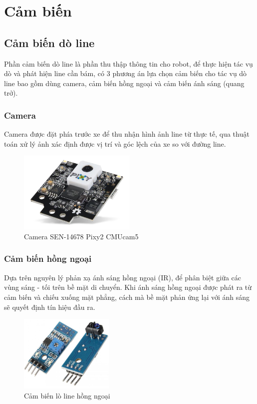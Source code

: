 





    \section{Cảm biến}
        \subsection{Cảm biến dò line}
            \hspace*{0.6cm}Phần cảm biến dò line là phần thu thập thông tin cho robot, để thực hiện tác vụ dò và
            phát hiện line cần bám, có 3 phương án lựa chọn cảm biến cho tác vụ dò line bao gồm dùng camera, cảm
            biến hồng ngoại và cảm biến ánh sáng (quang trở).
            \subsubsection{Camera}
            \hspace*{0.6cm}Camera được đặt phía trước xe để thu nhận hình ảnh line từ thực tế, qua thuật toán
        xử lý ảnh xác định được vị trí và góc lệch của xe so với đường line.
            \begin{figure}[H]
                \centering
                \includegraphics[width=0.5\textwidth]{pictures/chapter1/chapter1_pic15_camera.png}
                \caption{Camera SEN-14678 Pixy2 CMUcam5}
                \label{chap1_pic15}
            \end{figure}
        \subsubsection{Cảm biến hồng ngoại}
            \hspace*{0.6cm}Dựa trên nguyên lý phản xạ ánh sáng hồng ngoại (IR), để phân biệt giữa các vùng sáng - tối
            trên bề mặt di chuyển. Khi ánh sáng hồng ngoại được phát ra từ cảm biến và chiếu xuống mặt phẳng, cách mà bề mặt phản ứng lại với ánh sáng sẽ quyết định tín hiệu đầu ra.
            \begin{figure}[H]
                \centering
                \includegraphics[width=0.4\textwidth]{pictures/chapter1/chapter1_pic17_IR.png}
                \caption{Cảm biến lò line hồng ngoại}
                \label{chap1_pic17}
            \end{figure}

